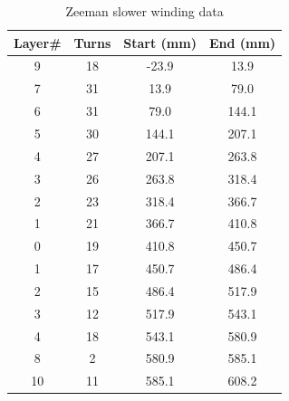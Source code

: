 \documentclass[12pt,a4paper]{article}
\begin{document}
\begin{table}[htb]
\begin{center}
\begin{tabular}{|c|c|c|c|}
\hline
\textbf{Layer\#} & \textbf{Turns} & \textbf{Start (mm)} & \textbf{End (mm)} \\
\hline
9 & 18 & -23.9 & 13.9 \\
\hline
7 & 31 & 13.9 & 79.0 \\
\hline
6 & 31 & 79.0 & 144.1 \\
\hline
5 & 30 & 144.1 & 207.1 \\
\hline
4 & 27 & 207.1 & 263.8 \\
\hline
3 & 26 & 263.8 & 318.4 \\
\hline
2 & 23 & 318.4 & 366.7 \\
\hline
1 & 21 & 366.7 & 410.8 \\
\hline
0 & 19 & 410.8 & 450.7 \\
\hline
1 & 17 & 450.7 & 486.4 \\
\hline
2 & 15 & 486.4 & 517.9 \\
\hline
3 & 12 & 517.9 & 543.1 \\
\hline
4 & 18 & 543.1 & 580.9 \\
\hline
8 & 2 & 580.9 & 585.1 \\
\hline
10 & 11 & 585.1 & 608.2 \\
\hline
\end{tabular}
\end{center}
\caption{Zeeman slower winding data}
\label{tab:layers}
\end{table}
\end{document}
